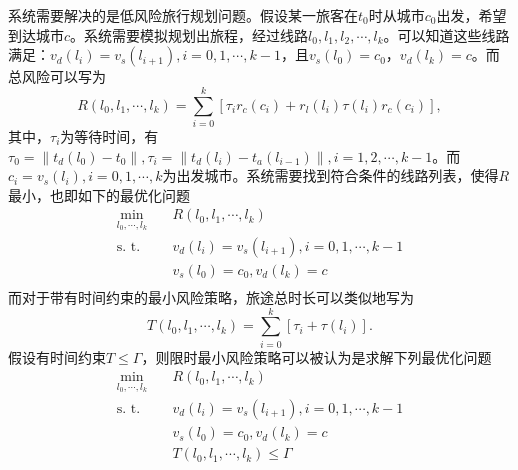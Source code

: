 系统需要解决的是低风险旅行规划问题。假设某一旅客在$t_0$时从城市$c_0$出发，希望到达城市$c$。系统需要模拟规划出旅程，经过线路$l_0, l_1, l_2, \cdots, l_k$。可以知道这些线路满足：$v_d(l_i) = v_s(l_{i+1}), i = 0, 1, \cdots, k-1$，且$v_s(l_0) = c_0$，$v_d(l_k) = c$。而总风险可以写为
\begin{equation}
  R(l_0, l_1, \cdots, l_k) = \sum_{i=0}^k \left[ \tau_i r_c(c_i) + r_l(l_i) \tau(l_i) r_c(c_i) \right],
\end{equation}
其中，$\tau_i$为等待时间，有$\tau_0 = \| t_d(l_0) - t_0 \|, \tau_i = \| t_d(l_i) - t_a(l_{i-1}) \|, i = 1, 2, \cdots, k-1$。而$c_i = v_s(l_i), i = 0, 1, \cdots, k$为出发城市。系统需要找到符合条件的线路列表，使得$R$最小，也即如下的最优化问题
\begin{equation}
  \begin{aligned}
    \min_{l_0, \cdots, l_k} \quad & R(l_0, l_1, \cdots, l_k) \\
    \text{s. t.} \quad & v_d(l_i) = v_s(l_{i+1}), i = 0, 1, \cdots, k-1 \\
    & v_s(l_0) = c_0, v_d(l_k) = c \\
  \end{aligned}
\end{equation}
而对于带有时间约束的最小风险策略，旅途总时长可以类似地写为
\begin{equation}
  T(l_0, l_1, \cdots, l_k) = \sum_{i=0}^k \left[ \tau_i + \tau(l_i) \right].
\end{equation}
假设有时间约束$T \le \Gamma$，则限时最小风险策略可以被认为是求解下列最优化问题
\begin{equation}
  \begin{aligned}
    \min_{l_0, \cdots, l_k} \quad & R(l_0, l_1, \cdots, l_k) \\
    \text{s. t.} \quad & v_d(l_i) = v_s(l_{i+1}), i = 0, 1, \cdots, k-1 \\
    & v_s(l_0) = c_0, v_d(l_k) = c \\
    & T(l_0, l_1, \cdots, l_k) \le \Gamma \\
  \end{aligned}
\end{equation}


